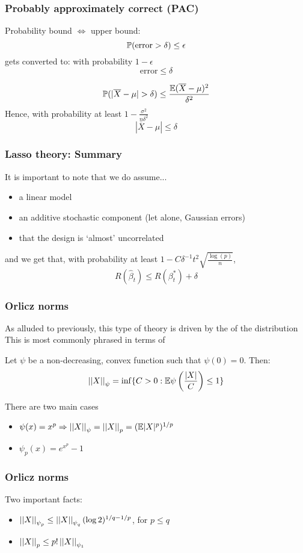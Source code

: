 \documentclass[12pt]{beamer}
\begin{document}
  \begin{frame}
  \frametitle{Probably approximately correct (PAC)}
Probability bound $\Leftrightarrow$  upper bound:
\[
\P(\textrm{error} > \delta) \leq \epsilon
\]
gets converted to: with probability $1-\epsilon$
\[
\textrm{error} \leq \delta
\]

\vsp
{} 
\[
\P(|\overline{X} - \mu| > \delta ) \leq \frac{\E(\overline{X} - \mu)^2}{\delta^2}
\]
Hence, with probability at least $1 - \frac{\sigma^2}{n\delta^2}$
\[
|\overline{X} - \mu| \leq \delta
\]
\end{frame}

  \begin{frame}
  \frametitle{Lasso theory: Summary}
It is important to note that we do  assume...
\begin{itemize}
\item a linear model
\item an additive stochastic component (let alone, Gaussian errors)
\item that the design is `almost' uncorrelated
\end{itemize}
and we get that, with probability at least $1-C\delta^{-1}t^2\sqrt{\frac{\log(p)}{n}}$,
\[
R(\hat\beta_t) \leq R(\beta_t^*) + \delta
\]
\end{frame}


\begin{frame}[fragile]
\frametitle{Orlicz norms}
As alluded to previously, this type of theory is driven by the  of the distribution
This is most commonly phrased in terms of 

\vsp
Let $\psi$ be a non-decreasing, convex function such that $\psi(0) = 0$. Then:
\[
\norm{X}_\psi = \inf\{ C > 0: \E \psi\left(  \frac{|X|}{C}\right) \leq 1\}
\]

\vsp
There are two main cases
\begin{itemize}
\item {} $\psi(x) = x^p \Rightarrow \norm{X}_\psi = \norm{X}_p = (\E |X|^p)^{1/p}$
\item {} $\psi_p(x)  = e^{x^p} - 1$ 
\end{itemize}
\end{frame}

\begin{frame}[fragile]
\frametitle{Orlicz norms}
Two important facts:
\begin{itemize}
\item $\norm{X}_{\psi_p} \leq \norm{X}_{\psi_q}(\log 2)^{1/q - 1/p}$, for $p \leq q$
\item $\norm{X}_{p} \leq p!\norm{X}_{\psi_1}$
\end{itemize}
\end{frame}
\end{document}
